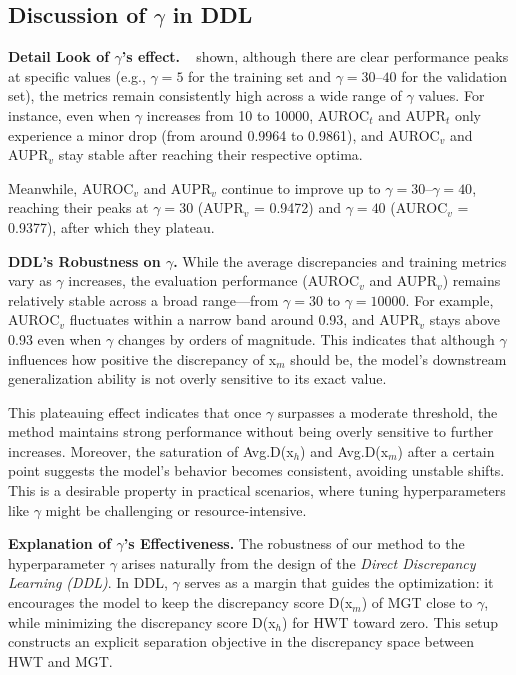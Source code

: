 \documentclass[sigconf, screen, review, anonymous]{acmart}
\begin{document}
\subsection{Discussion of $\gamma$ in DDL}
\noindent \textbf{Detail Look of $\gamma$'s effect. }
~ shown, although there are clear performance peaks at specific values (e.g., $\gamma=5$ for the training set and $\gamma=30$–$40$ for the validation set), the metrics remain consistently high across a wide range of $\gamma$ values. For instance, even when $\gamma$ increases from 10 to 10000, AUROC$_t$ and AUPR$_t$ only experience a minor drop (from around 0.9964 to 0.9861), and AUROC$_v$ and AUPR$_v$ stay stable after reaching their respective optima.

Meanwhile, AUROC$_v$ and AUPR$_v$ continue to improve up to $\gamma=30$–$\gamma=40$, reaching their peaks at $\gamma=30$ (AUPR$_v$ = 0.9472) and $\gamma=40$ (AUROC$_v$ = 0.9377), after which they plateau.

\noindent \textbf{DDL's Robustness on $\gamma$. }
While the average discrepancies and training metrics vary as $\gamma$ increases, the evaluation performance (AUROC$_v$ and AUPR$_v$) remains relatively stable across a broad range—from $\gamma=30$ to $\gamma=10000$. For example, AUROC$_v$ fluctuates within a narrow band around 0.93, and AUPR$_v$ stays above 0.93 even when $\gamma$ changes by orders of magnitude. This indicates that although $\gamma$ influences how positive the discrepancy of x$_m$ should be, the model's downstream generalization ability is not overly sensitive to its exact value.

This plateauing effect indicates that once $\gamma$ surpasses a moderate threshold, the method maintains strong performance without being overly sensitive to further increases. Moreover, the saturation of Avg.D(x$_h$) and Avg.D(x$_m$) after a certain point suggests the model's behavior becomes consistent, avoiding unstable shifts.
%
This is a desirable property in practical scenarios, where tuning hyperparameters like $\gamma$ might be challenging or resource-intensive.

\noindent \textbf{Explanation of $\gamma$'s Effectiveness. }
The robustness of our method to the hyperparameter $\gamma$ arises naturally from the design of the \textit{Direct Discrepancy Learning (DDL)}. In DDL, $\gamma$ serves as a margin that guides the optimization: it encourages the model to keep the discrepancy score D(x$_m$) of MGT close to $\gamma$, while minimizing the discrepancy score D(x$_h$) for HWT toward zero. This setup constructs an explicit separation objective in the discrepancy space between HWT and MGT.
\end{document}
